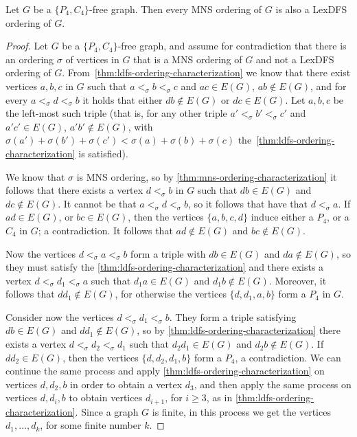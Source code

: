 \documentclass{svproc}
\begin{document}
\begin{lemma}\label{lem:p4c4-lexdfs}
Let $G$ be a $\{P_4,C_4\}$-free graph.
Then every MNS ordering of $G$ is also a LexDFS ordering of $G$. 
\end{lemma}
\begin{proof}

Let $G$ be a $\{P_4,C_4\}$-free graph, and assume for contradiction that there is an ordering $\sigma$ of vertices in $G$ that is a MNS ordering of $G$ and not a LexDFS ordering of $G$. From~\cref{thm:ldfs-ordering-characterization} we know that there exist vertices $a,b,c$ in $G$ such that $a<_\sigma
b<_\sigma c$ and $ac\in E(G)$, $ab\notin E(G)$, and for every $a<_\sigma d<_\sigma b$ it holds that either $db\notin E(G)$ or $dc\in E(G)$. Let $a,b,c$ be the left-most such triple (that is, for any other triple $a'<_\sigma
b'<_\sigma c'$ and $a'c'\in E(G)$, $a'b'\notin E(G)$, with $\sigma(a')+\sigma(b')+\sigma(c')< \sigma(a)+\sigma(b)+\sigma(c)$ the~\cref{thm:ldfs-ordering-characterization} is satisfied). 

We know that $\sigma$ is MNS ordering, so by \cref{thm:mns-ordering-characterization} it follows that there exists a vertex $ d<_\sigma b$ in $G$ such that $db\in E(G)$ and $dc\notin E(G)$. It cannot be that $a<_\sigma d<_\sigma b$, so it follows that have that $d<_\sigma a$. If $ad\in E(G)$, or $bc\in E(G)$, then the vertices $\{a,b,c,d\}$ induce either a $P_4$, or a $C_4$ in $G$; a contradiction. It follows that $ad\notin E(G)$ and $bc\notin E(G)$. 

Now the vertices $d<_\sigma a<_\sigma b$ form a triple with $db\in E(G)$ and $da\notin E(G)$, so they must satisfy the \cref{thm:ldfs-ordering-characterization} and there exists a vertex $d<_\sigma d_1<_\sigma a$ such that $d_1a\in E(G)$ and $d_1b\notin E(G)$. Moreover, it follows that $dd_1\notin E(G)$, for otherwise the vertices $\{d,d_1,a,b\}$ form a $P_4$ in $G$. 

Consider now the vertices $d<_\sigma d_1<_\sigma b$. They form a triple satisfying $db\in E(G)$ and $dd_1\notin E(G)$, so by \cref{thm:ldfs-ordering-characterization} there exists a vertex $d<_\sigma d_2<_\sigma d_1$ such that $d_2d_1\in E(G)$ and $d_2b\notin E(G)$. If $dd_2\in E(G)$, then the vertices $\{d,d_2,d_1,b\}$ form a $P_4$, a contradiction. 
We can continue the same process and apply \cref{thm:ldfs-ordering-characterization} on vertices $d,d_2,b$ in order to obtain a vertex $d_3$, and then apply the same process on vertices $d,d_i,b$ to obtain vertices $d_{i+1}$, for $i\ge 3$, as in \cref{thm:ldfs-ordering-characterization}.
Since a graph $G$ is finite, in this process we get the vertices $d_1,\dots, d_k$, for some finite number $k$.


\end{proof}
\end{document}
